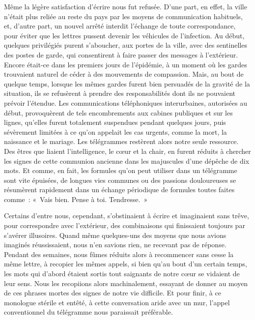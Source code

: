 \documentclass[french,twoside]{book} %
\begin{document}
Même la légère satisfaction d’écrire nous fut refusée. D’une part, en effet, la ville n’était plus reliée au reste du pays par les moyens de communication habituels, et, d’autre part, un nouvel arrêté interdit l’échange de toute correspondance, pour éviter que les lettres pussent devenir les véhicules de l’infection. Au début, quelques privilégiés purent s’aboucher, aux portes de la ville, avec des sentinelles des postes de garde, qui consentirent à faire passer des messages à l’extérieur. Encore était-ce dans les premiers jours de l’épidémie, à un moment où les gardes trouvaient naturel de céder à des mouvements de compassion. Mais, au bout de quelque temps, lorsque les mêmes gardes furent bien persuadés de la gravité de la situation, ils se refusèrent à prendre des responsabilités dont ils ne pouvaient prévoir l’étendue. Les communications téléphoniques interurbaines, autorisées au début, provoquèrent de tels encombrements aux cabines publiques et sur les lignes, qu’elles furent totalement suspendues pendant quelques jours, puis sévèrement limitées à ce qu’on appelait les cas urgents, comme la mort, la naissance et le mariage. Les télégrammes restèrent alors notre seule ressource. Des êtres que liaient l’intelligence, le cœur et la chair, en furent réduits à chercher les signes de cette communion ancienne dans les majuscules d’une dépêche de dix mots. Et comme, en fait, les formules qu’on peut utiliser dans un télégramme sont vite épuisées, de longues vies communes ou des passions douloureuses se résumèrent rapidement dans un échange périodique de formules toutes faites comme : « Vais bien. Pense à toi. Tendresse. »\par
Certains d’entre nous, cependant, s’obstinaient à écrire et imaginaient sans trêve, pour correspondre avec l’extérieur, des combinaisons qui finissaient toujours par s’avérer illusoires. Quand même quelques-uns des moyens que nous avions imaginés réussissaient, nous n’en savions rien, ne recevant pas de réponse. Pendant des semaines, nous fûmes réduits alors à recommencer sans cesse la même lettre, à recopier les mêmes appels, si bien qu’au bout d’un certain temps, les mots qui d’abord étaient sortis tout saignants de notre cœur se vidaient de leur sens. Nous les recopiions alors machinalement, essayant de donner au moyen de ces phrases mortes des signes de notre vie difficile. Et pour finir, à ce monologue stérile et entêté, à cette conversation aride avec un mur, l’appel conventionnel du télégramme nous paraissait préférable.\par
\end{document}
